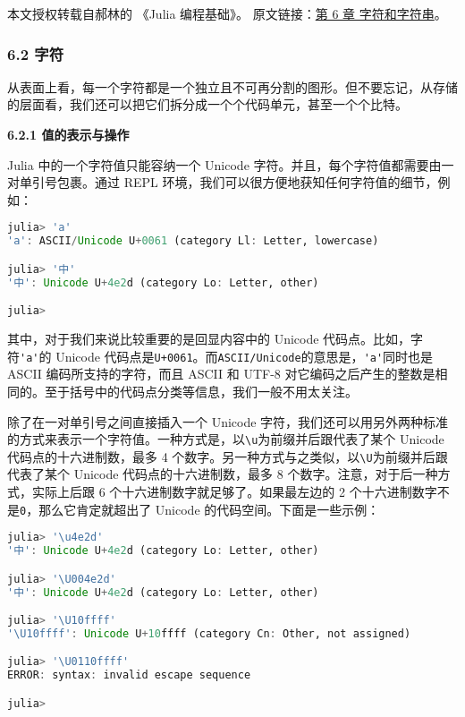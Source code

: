 
本文授权转载自郝林的 《Julia 编程基础》。 原文链接：\href{https://github.com/hyper0x/JuliaBasics/blob/master/book/ch06.md}{第 6 章 字符和字符串}。


\subsubsection{6.2 字符}

从表面上看，每一个字符都是一个独立且不可再分割的图形。但不要忘记，从存储的层面看，我们还可以把它们拆分成一个个代码单元，甚至一个个比特。

\textbf{6.2.1 值的表示与操作}

Julia 中的一个字符值只能容纳一个 Unicode 字符。并且，每个字符值都需要由一对单引号包裹。通过 REPL 环境，我们可以很方便地获知任何字符值的细节，例如：
\begin{lstlisting}[language=julia]
julia> 'a'
'a': ASCII/Unicode U+0061 (category Ll: Letter, lowercase)

julia> '中'
'中': Unicode U+4e2d (category Lo: Letter, other)

julia> 
\end{lstlisting}

其中，对于我们来说比较重要的是回显内容中的 Unicode 代码点。比如，字符\verb`'a'`的 Unicode 代码点是\verb`U+0061`。而\verb`ASCII/Unicode`的意思是，\verb`'a'`同时也是 ASCII 编码所支持的字符，而且 ASCII 和 UTF-8 对它编码之后产生的整数是相同的。至于括号中的代码点分类等信息，我们一般不用太关注。

除了在一对单引号之间直接插入一个 Unicode 字符，我们还可以用另外两种标准的方式来表示一个字符值。一种方式是，以\verb`\u`为前缀并后跟代表了某个 Unicode 代码点的十六进制数，最多 4 个数字。另一种方式与之类似，以\verb`\U`为前缀并后跟代表了某个 Unicode 代码点的十六进制数，最多 8 个数字。注意，对于后一种方式，实际上后跟 6 个十六进制数字就足够了。如果最左边的 2 个十六进制数字不是\verb`0`，那么它肯定就超出了 Unicode 的代码空间。下面是一些示例：
\begin{lstlisting}[language=julia]
julia> '\u4e2d'
'中': Unicode U+4e2d (category Lo: Letter, other)

julia> '\U004e2d'
'中': Unicode U+4e2d (category Lo: Letter, other)

julia> '\U10ffff'
'\U10ffff': Unicode U+10ffff (category Cn: Other, not assigned)

julia> '\U0110ffff'
ERROR: syntax: invalid escape sequence

julia> 
\end{lstlisting}

